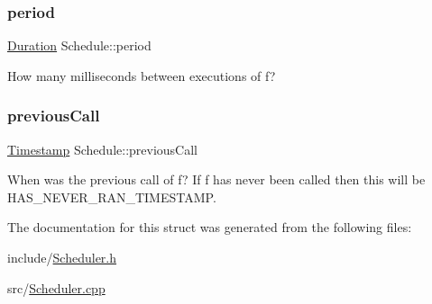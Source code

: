\subsubsection{\texorpdfstring{period}{period}}
{\footnotesize\ttfamily \mbox{\hyperlink{_scheduler_8h_aca1fa1a7edde6bf9e22c7617400fad31}{Duration}} Schedule\+::period}

How many milliseconds between executions of {\ttfamily f}? \mbox{\label{struct_schedule_ab512e16f533bdc7a1c9d8c5c2bad0f7a}} 
\subsubsection{\texorpdfstring{previous\+Call}{previousCall}}
{\footnotesize\ttfamily \mbox{\hyperlink{_scheduler_8h_a67c6ac2398ae81344762ebb1b71fc9a7}{Timestamp}} Schedule\+::previous\+Call}

When was the previous call of {\ttfamily f}? If {\ttfamily f} has never been called then this will be {\ttfamily H\+A\+S\+\_\+\+N\+E\+V\+E\+R\+\_\+\+R\+A\+N\+\_\+\+T\+I\+M\+E\+S\+T\+A\+MP}. 

The documentation for this struct was generated from the following files\+:\begin{DoxyCompactItemize}
\item 
include/\mbox{\hyperlink{_scheduler_8h}{Scheduler.\+h}}\item 
src/\mbox{\hyperlink{_scheduler_8cpp}{Scheduler.\+cpp}}\end{DoxyCompactItemize}
